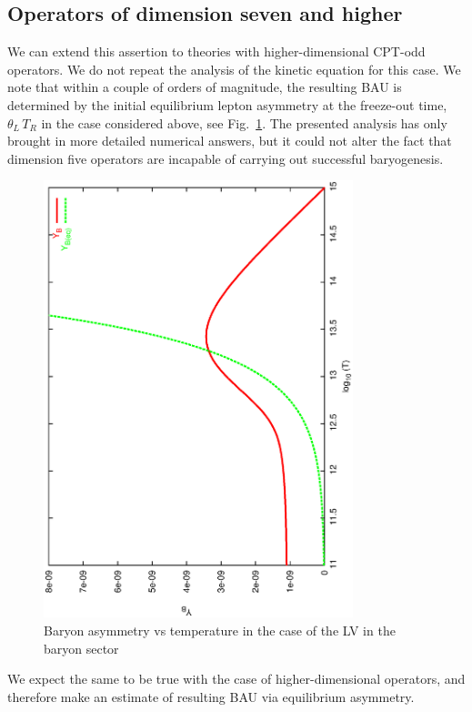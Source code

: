 \documentclass[12pt]{revtex4}
\begin{document}
\subsection{Operators of dimension seven and higher}

	We can extend this assertion to theories with higher-dimensional 
	CPT-odd operators. 
	We do not repeat the analysis of the kinetic equation 
	for this case.
	We note that within a couple of orders of magnitude, the resulting BAU
	is determined by the initial equilibrium lepton asymmetry
	at the freeze-out time, $ \theta_L\,T_R $ in the case considered
	above, see Fig.~\ref{b_dom_asymm_bau}.
	The presented analysis has only brought in more 
	detailed numerical answers, but it could not alter the fact that
	dimension five operators are incapable of carrying out successful
	baryogenesis.
\begin{figure}
\includegraphics[width=9cm,angle=270]{b_dom_asymm_bau.ps}
\caption{Baryon asymmetry vs temperature in the case of the LV in the baryon sector}
\label{b_dom_asymm_bau}
\end{figure}
	
	We expect the same to be true with the case of higher-dimensional
	operators, and therefore make an estimate of resulting BAU 
	via equilibrium asymmetry.
\end{document}
